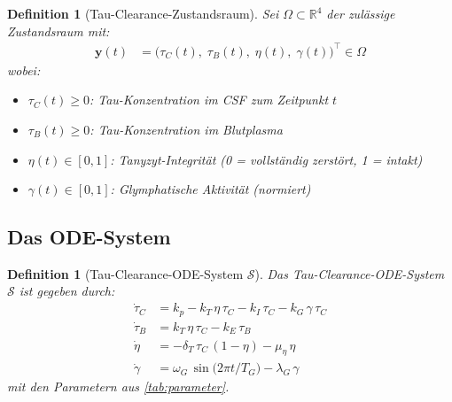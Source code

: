 ﻿\documentclass[12pt,a4paper]{article}
\newtheorem{definition}[theorem]{Definition}
\theoremstyle{definition}
\newcommand{\R}{\mathbb{R}}
\begin{document}
	\begin{definition}[Tau-Clearance-Zustandsraum]
		\label{def:zustandsraum}
		Sei $\Omega \subset \R^4$ der zulässige Zustandsraum mit:
		\begin{align}
			\mathbf{y}(t) &= \bigl(\tau_C(t),\; \tau_B(t),\; \eta(t),\; \gamma(t)\bigr)^\top \in \Omega
		\end{align}
		wobei:
		\begin{itemize}
			\item $\tau_C(t) \geq 0$: Tau-Konzentration im CSF zum Zeitpunkt $t$
			\item $\tau_B(t) \geq 0$: Tau-Konzentration im Blutplasma
			\item $\eta(t) \in [0,1]$: Tanyzyt-Integrität (0 = vollständig zerstört, 1 = intakt)
			\item $\gamma(t) \in [0,1]$: Glymphatische Aktivität (normiert)
		\end{itemize}
	\end{definition}
	
	\subsection{Das ODE-System}
	
	\begin{definition}[Tau-Clearance-ODE-System $\mathcal{S}$]
		\label{def:ode_system}
		Das \emph{Tau-Clearance-ODE-System} $\mathcal{S}$ ist gegeben durch:
		\begin{align}
			\dot{\tau}_C &= k_p - k_T\,\eta\,\tau_C - k_I\,\tau_C - k_G\,\gamma\,\tau_C 
			\label{eq:tau_csf}\\
			\dot{\tau}_B &= k_T\,\eta\,\tau_C - k_E\,\tau_B 
			\label{eq:tau_blood}\\
			\dot{\eta}   &= -\delta_T\,\tau_C\,(1-\eta) - \mu_\eta\,\eta 
			\label{eq:tanyzyt}\\
			\dot{\gamma} &= \omega_G\,\sin\!\bigl(2\pi t / T_G\bigr) - \lambda_G\,\gamma 
			\label{eq:glymph}
		\end{align}
		mit den Parametern aus \cref{tab:parameter}.
	\end{definition}
	
\end{document}
